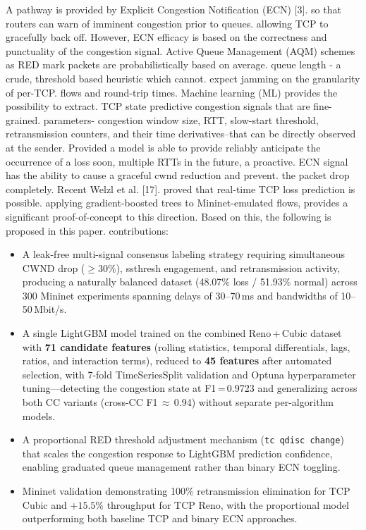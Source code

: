 \documentclass[journal]{IEEEtran}
\begin{document}
A pathway is provided by Explicit Congestion Notification (ECN) [3].
so that routers can warn of imminent congestion prior to queues.
allowing TCP to gracefully back off. However, ECN
efficacy is based on the correctness and punctuality of the
congestion signal. Active Queue Management (AQM) schemes
as RED mark packets are probabilistically based on average.
queue length - a crude, threshold based heuristic which cannot.
expect jamming on the granularity of per-TCP.
flows and round-trip times.
Machine learning (ML) provides the possibility to extract.
TCP state predictive congestion signals that are fine-grained.
parameters- congestion window size, RTT, slow-start threshold,
retransmission counters, and their time derivatives--that
can be directly observed at the sender. Provided a model is able to provide reliably
anticipate the occurrence of a loss soon, multiple RTTs in the future, a proactive.
ECN signal has the ability to cause a graceful cwnd reduction and prevent.
the packet drop completely. Recent Welzl et al. [17].
proved that real-time TCP loss prediction is possible.
applying gradient-boosted trees to Mininet-emulated flows, provides a significant proof-of-concept to this direction.
Based on this, the following is proposed in this paper.
contributions:
\begin{itemize}
  \item A leak-free multi-signal consensus labeling strategy requiring simultaneous CWND drop ($\geq30\%$), ssthresh engagement, and retransmission activity, producing a naturally balanced dataset (48.07\% loss / 51.93\% normal) across 300 Mininet experiments spanning delays of 30--70\,ms and bandwidths of 10--50\,Mbit/s.

  \item A single LightGBM model trained on the combined Reno\,+\,Cubic dataset with \textbf{71 candidate features} (rolling statistics, temporal differentials, lags, ratios, and interaction terms), reduced to \textbf{45 features} after automated selection, with 7-fold TimeSeriesSplit validation and Optuna hyperparameter tuning---detecting the congestion state at F1\,=\,0.9723 and generalizing across both CC variants (cross-CC F1\,$\approx$\,0.94) without separate per-algorithm models.

  \item A proportional RED threshold adjustment mechanism (\texttt{tc qdisc change}) that scales the congestion response to LightGBM prediction confidence, enabling graduated queue management rather than binary ECN toggling.

  \item Mininet validation demonstrating 100\% retransmission elimination for TCP Cubic and $+15.5\%$ throughput for TCP Reno, with the proportional model outperforming both baseline TCP and binary ECN approaches.
\end{itemize}
\end{document}
